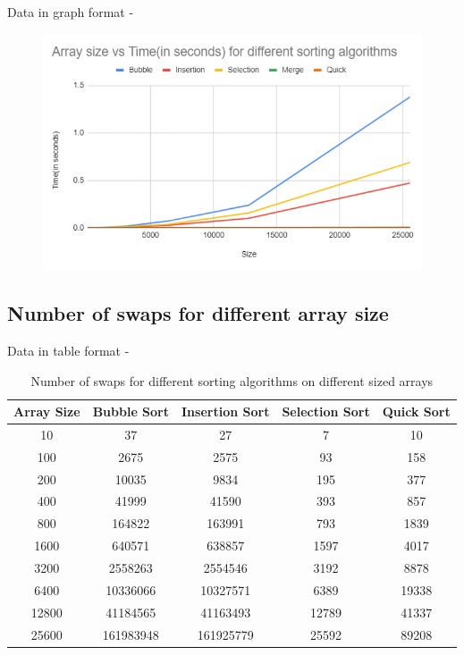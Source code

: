 \documentclass{report}
\begin{document}
Data in graph format - 


\begin{figure}[H]
\centering
\includegraphics[scale=0.8]{sizevstime.png}

\end{figure}


\subsection{Number of swaps for different array size}

Data in table format -

\begin{table}[H]
\centering
\begin{tabular}{|c|c|c|c|c|}
\hline
\textbf{Array Size} & \textbf{Bubble Sort} & \textbf{Insertion Sort} & \textbf{Selection Sort} & \textbf{Quick Sort} \\ \hline
10 & 37 & 27 & 7 & 10 \\ \hline
100 & 2675 & 2575 & 93 & 158 \\ \hline
200 & 10035 & 9834 & 195 & 377 \\ \hline
400 & 41999 & 41590 & 393 & 857 \\ \hline
800 & 164822 & 163991 & 793 & 1839 \\ \hline
1600 & 640571 & 638857 & 1597 & 4017 \\ \hline
3200 & 2558263 & 2554546 & 3192 & 8878 \\ \hline
6400 & 10336066 & 10327571 & 6389 & 19338 \\ \hline
12800 & 41184565 & 41163493 & 12789 & 41337 \\ \hline
25600 & 161983948 & 161925779 & 25592 & 89208 \\ \hline
\end{tabular}
\caption{Number of swaps for different sorting algorithms on different sized arrays}
\end{table}
\end{document}
